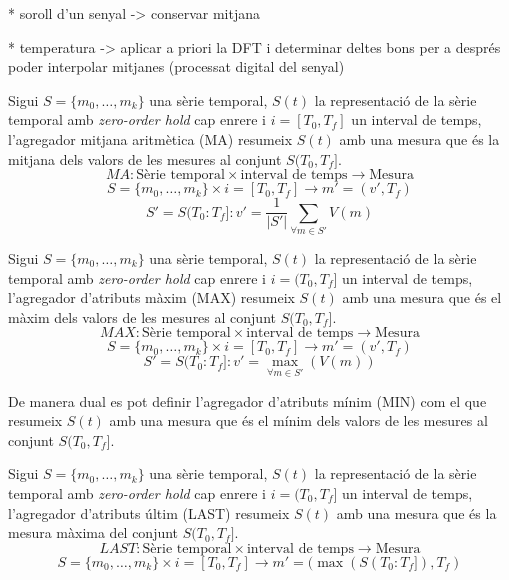 * soroll d'un senyal -> conservar mitjana

* temperatura -> aplicar a priori la DFT i determinar deltes bons per a després poder interpolar mitjanes (processat digital del senyal)





\begin{definition}
  Sigui $S=\{m_0,\ldots,m_k\}$ una sèrie temporal, $S(t)$ la
  representació de la sèrie temporal amb \emph{zero-order hold} cap
  enrere i $i=[T_0,T_f]$ un interval de temps, l'agregador mitjana
  aritmètica (MA) resumeix $S(t)$ amb una mesura que és la mitjana dels
  valors de les mesures al conjunt $S(T_0,T_f]$.
\[
MA: \text{Sèrie temporal} \times \text{interval de temps}
\longrightarrow \text{Mesura}
\]
\[
S=\{m_0,\ldots,m_k\} \times i=[T_0,T_f] \longrightarrow m'=(v',T_f)
\]
\[
S'=S(T_0:T_f]:
v' = \frac{1}{|S'|} \sum\limits_{\forall m\in S'} V(m)
\]
\end{definition}

\begin{definition}
  Sigui $S=\{m_0,\ldots,m_k\}$ una sèrie temporal, $S(t)$ la
  representació de la sèrie temporal amb \emph{zero-order hold} cap
  enrere i $i=(T_0,T_f]$ un interval de temps, l'agregador d'atributs màxim
  (MAX) resumeix $S(t)$ amb una mesura que és el màxim dels valors
  de les mesures al conjunt $S(T_0,T_f]$.
\[
MAX: \text{Sèrie temporal} \times \text{interval de temps} \longrightarrow \text{Mesura}
\]
\[
S=\{m_0,\ldots,m_k\} \times i=[T_0,T_f]  \longrightarrow m'=(v',T_f)
\]
\[
S'=S(T_0:T_f]:
v' = \max_{\forall m \in S'}(V(m))
\]
\end{definition}

De manera dual es pot definir l'agregador d'atributs mínim (MIN) com el
que resumeix $S(t)$ amb una mesura que és el mínim dels valors de les
mesures al conjunt $S(T_0,T_f]$.


\begin{definition}
  Sigui $S=\{m_0,\ldots,m_k\}$ una sèrie temporal, $S(t)$ la
  representació de la sèrie temporal amb \emph{zero-order hold} cap
  enrere i $i=(T_0,T_f]$ un interval de temps, l'agregador d'atributs últim
  (LAST) resumeix $S(t)$ amb una mesura que és la mesura màxima del
  conjunt $S(T_0,T_f]$.
\[
LAST: \text{Sèrie temporal} \times \text{interval de temps} \longrightarrow \text{Mesura}
\]
\[
S=\{m_0,\ldots,m_k\} \times i=[T_0,T_f]  \longrightarrow m'=(\max(S(T_0:T_f]),T_f)
\]
\end{definition}




